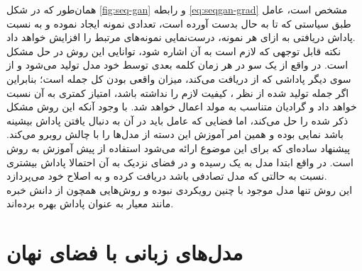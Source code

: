 همان‌طور که در شکل \ref{fig:seq-gan} و رابطه \ref{eq:seqgan-grad} مشخص است، عامل طبق سیاستی که تا به حال بدست آورده است، تعدادی نمونه ایجاد نموده و به نسبت پاداش دریافتی به ازای هر نمونه، درست‌نمایی نمونه‌های مرتبط را افزایش خواهد داد.\\
نکته قابل توجهی که لازم است به آن اشاره شود، توانایی این روش در حل مشکل \expbias{} است. در واقع از یک سو در هر زمان کلمه بعدی توسط خود مدل تولید می‌شود و از سوی دیگر پاداشی که از \discriminator{} دریافت می‌کند، میزان  واقعی بودن کل جمله است؛ بنابراین اگر جمله تولید شده از نظر \discriminator{}، کیفیت لازم را نداشته باشد، \discriminator{} امتیاز کمتری به آن نسبت خواهد داد و گرادیان متناسب به مولد اعمال خواهد شد. با وجود آنکه این روش مشکل ذکر شده را حل می‌کند، اما فضایی که عامل باید در آن به دنبال یافتن پاداش بیشینه باشد نمایی بوده و همین امر آموزش این دسته از مدل‌ها را با چالش روبرو می‌کند. پیشنهاد ساده‌ای که برای این موضوع ارائه می‌شود استفاده از پیش آموزش به روش \teacherforcing{} است. در واقع ابتدا مدل به یک 
رسیده و در فضای نزدیک به آن احتمالا پاداش بیشتری نسبت به حالتی که مدل تصادفی باشد دریافت کرده و به اصلاح خود می‌پردازد.\\
این روش تنها مدل موجود با چنین رویکردی نبوده و روش‌هایی همچون \cite{pg_bleu} از دانش خبره مانند معیار  به عنوان پاداش بهره برده‌اند.
\section{مدل‌های زبانی با فضای نهان}
